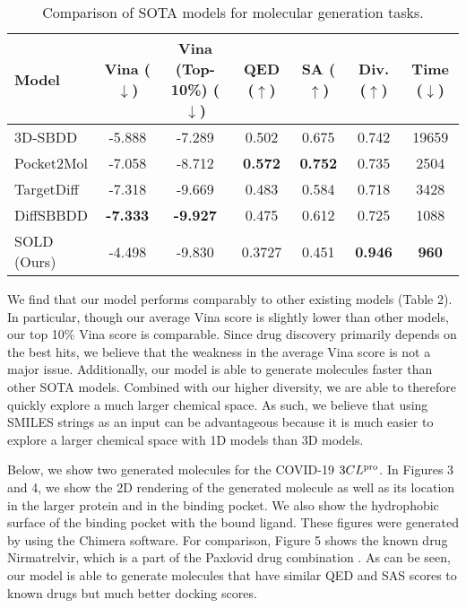 \documentclass[11pt]{article}
\begin{document}
\begin{table}[H]
    \centering
    \begin{tabular}{l|c|c|c|c|c|c}
    \hline
    \textbf{Model} & \textbf{Vina ($\downarrow$)} & \textbf{Vina (Top-10\%) ($\downarrow$)} & \textbf{QED ($\uparrow$)} & \textbf{SA ($\uparrow$)} & \textbf{Div. ($\uparrow$)} & \textbf{Time ($\downarrow$)} \\ \hline
    3D-SBDD \cite{luo20223dgenerativemodelstructurebased} & -5.888 & -7.289 & \cellcolor{lightgray}0.502 & \cellcolor{lightgray}0.675 & \cellcolor{lightgray}0.742 & 19659 \\ 
    Pocket2Mol \cite{peng2022pocket2molefficientmolecularsampling} & -7.058 & -8.712 & \cellcolor{darkgray}\textbf{0.572} & \cellcolor{darkgray}\textbf{0.752} & 0.735 & 2504 \\ 
    TargetDiff \cite{guan2023d} & \cellcolor{lightgray}-7.318 & -9.669 & 0.483 & 0.584 & 0.718 & 3428 \\ 
    DiffSBBDD \cite{schneuing2023} & \cellcolor{darkgray}\textbf{-7.333} & \cellcolor{darkgray}\textbf{-9.927} & 0.475 & 0.612 & 0.725 & \cellcolor{lightgray}1088 \\ 
    \hline 
    SOLD (Ours) & -4.498 & \cellcolor{lightgray}-9.830 & 0.3727 & 0.451 & \cellcolor{darkgray}\textbf{0.946} & \cellcolor{darkgray}\textbf{960} \\ \hline
    \end{tabular}
    \caption{Comparison of SOTA models for molecular generation tasks.}
\end{table}

We find that our model performs comparably to other existing models (Table 2). 
In particular, though our average Vina score is slightly lower than other 
models, our top 10\% Vina score is comparable. Since drug discovery 
primarily depends on the best hits, we believe that the weakness in 
the average Vina score is not a major issue. Additionally, our model 
is able to generate molecules faster than other SOTA models. Combined with 
our higher diversity, we are able to therefore quickly explore a much larger 
chemical space. As such, we believe that using SMILES strings 
as an input can be advantageous because it is much easier to explore 
a larger chemical space with 1D models than 3D models. 

Below, we show two generated molecules for the COVID-19 $3CL\textsuperscript{pro}$. In Figures 3 and 4, we show 
the 2D rendering of the generated molecule as well as its location in the 
larger protein and in the binding pocket. We also show the hydrophobic 
surface of the binding pocket with the bound ligand. These figures were generated by 
using the Chimera software. For comparison, Figure 5 
shows the known drug Nirmatrelvir, which is a part of the Paxlovid drug combination 
\cite{Reina2022-xy}. As can be seen, our model is able to generate molecules that 
have similar QED and SAS scores to known drugs but much better docking scores.
\end{document}
